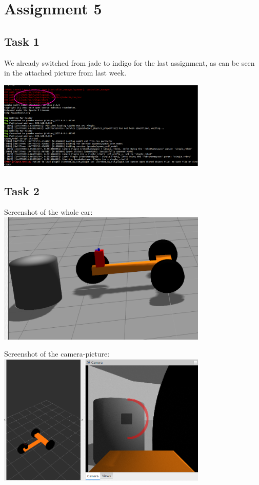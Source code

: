 \chapter{Assignment 5}\label{ass5}

\section{Task 1}\label{ass5_t1}

We already switched from jade to indigo for the last assignment, as can be seen in the attached picture from last week.

\includegraphics[width=0.75\textwidth]{img/screen_ue5_t1.png}

\section{Task 2}\label{ass5_t2}

Screenshot of the whole car:\\
\includegraphics[width=0.75\textwidth]{img/screen_ue5_t2_car.png}\newpage

Screenshot of the camera-picture:\\
\includegraphics[width=0.75\textwidth]{img/screen_ue5_t2_cam.png}

